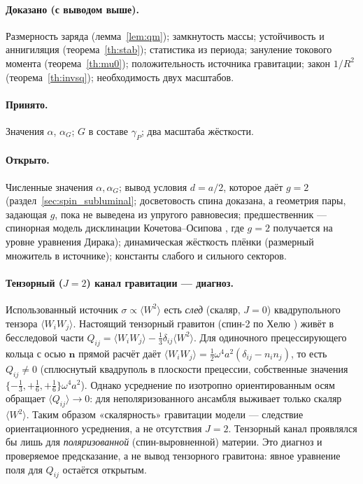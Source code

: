 \documentclass[12pt,a4paper]{article}
\begin{document}
\paragraph{Доказано (с выводом выше).} Размерность заряда (лемма~\ref{lem:qm});
замкнутость массы; устойчивость и аннигиляция (теорема~\ref{th:stab});
статистика из периода; зануление токового момента (теорема~\ref{th:mu0});
положительность источника гравитации; закон $1/R^2$ (теорема~\ref{th:invsq});
необходимость двух масштабов.

\paragraph{Принято.} Значения $\alpha$, $\alpha_G$; $G$ в составе $\gamma_P$;
два масштаба жёсткости.

\paragraph{Открыто.} Численные значения $\alpha,\alpha_G$; вывод условия $d=a/2$, которое даёт $g=2$
(раздел~\ref{sec:spin_subluminal}; досветовость спина доказана, а геометрия
пары, задающая $g$, пока не выведена из упругого равновесия; предшественник ---
спинорная модель дисклинации Кочетова--Осипова \cite{osipov2010}, где $g=2$
получается на уровне уравнения Дирака);
динамическая жёсткость плёнки (размерный множитель в источнике); константы
слабого и сильного секторов.

\paragraph{Тензорный ($J{=}2$) канал гравитации --- диагноз.} Использованный
источник $\sigma\propto\langle W^2\rangle$ есть \emph{след} (скаляр, $J=0$)
квадрупольного тензора $\langle W_iW_j\rangle$. Настоящий тензорный гравитон
(спин-2 по Хелю \cite{hehl1995}) живёт в бесследовой части
$Q_{ij}=\langle W_iW_j\rangle-\tfrac13\delta_{ij}\langle W^2\rangle$. Для
одиночного прецессирующего кольца с осью $\mathbf n$ прямой расчёт даёт
$\langle W_iW_j\rangle=\tfrac12\omega^4a^2(\delta_{ij}-n_in_j)$, то есть
$Q_{ij}\neq0$ (сплюснутый квадруполь в плоскости прецессии, собственные
значения $\{-\tfrac13,+\tfrac16,+\tfrac16\}\omega^4a^2$). Однако усреднение по
изотропно ориентированным осям обращает $\langle Q_{ij}\rangle\to0$: для
неполяризованного ансамбля выживает только скаляр $\langle W^2\rangle$. Таким
образом «скалярность» гравитации модели --- следствие ориентационного
усреднения, а не отсутствия $J=2$. Тензорный канал проявлялся бы лишь для
\emph{поляризованной} (спин-выровненной) материи. Это диагноз и проверяемое
предсказание, а не вывод тензорного гравитона: явное уравнение поля для
$Q_{ij}$ остаётся открытым.
\end{document}
